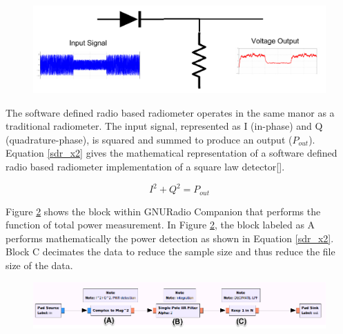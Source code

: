 
{\begin{figure}[h!tb] 
\centering
\includegraphics[width=17cm]{Images/square_law.pdf}
\label{square_law_simple}
\end{figure}
}

The software defined radio based radiometer operates in the same manor as a traditional radiometer.  The input signal, represented as I (in-phase) and Q (quadrature-phase), is squared and summed to produce an output ($P_{out}$).  Equation \ref{sdr_x2} gives the mathematical representation of a software defined radio based radiometer implementation of a square law detector[\cite{Rashid}]. 

\begin{equation}\label{sdr_x2}
I^2+Q^2 = P_{out}
\end{equation}

Figure \ref{square_block} shows the block within GNURadio Companion that performs the function of total power measurement.  In Figure \ref{square_block}, the block labeled as A performs mathematically the power detection as shown in Equation \ref{sdr_x2}.  Block C decimates the data to reduce the sample size and thus reduce the file size of the data.  

{\begin{figure}[h!tb] 
\centering
\includegraphics[width=17cm]{Images/TPR_grc.png}
\label{square_block}
\end{figure}
}

